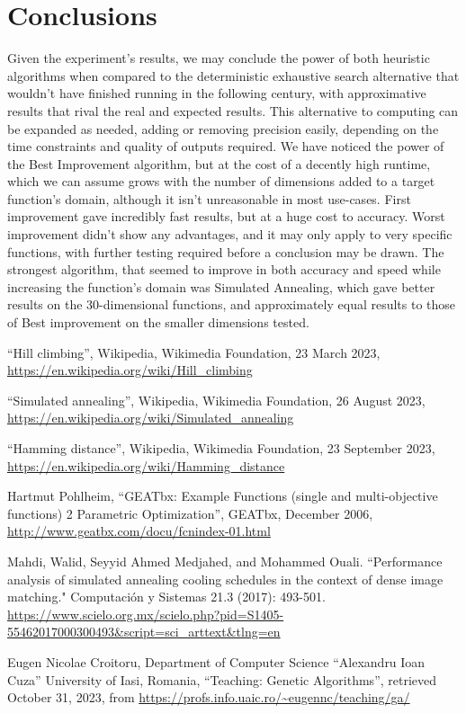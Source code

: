 \documentclass{article}
\begin{document}
\section{Conclusions}
Given the experiment's results, we may conclude the power of both heuristic algorithms when compared to the deterministic exhaustive search alternative that wouldn't have finished running in the following century, with approximative results that rival the real and expected results. This alternative to computing can be expanded as needed, adding or removing precision easily, depending on the time constraints and quality of outputs required. We have noticed the power of the Best Improvement algorithm, but at the cost of a decently high runtime, which we can assume grows with the number of dimensions added to a target function's domain, although it isn't unreasonable in most use-cases. First improvement gave incredibly fast results, but at a huge cost to accuracy. Worst improvement didn't show any advantages, and it may only apply to very specific functions, with further testing required before a conclusion may be drawn. The strongest algorithm, that seemed to improve in both accuracy and speed while increasing the function's domain was Simulated Annealing, which gave better results on the 30-dimensional functions, and approximately equal results to those of Best improvement on the smaller dimensions tested.

\begin{thebibliography}{9}

``Hill climbing'', Wikipedia, Wikimedia Foundation, 23 March 2023, \url{https://en.wikipedia.org/wiki/Hill\_climbing}

``Simulated annealing'', Wikipedia, Wikimedia Foundation, 26 August 2023, \url{https://en.wikipedia.org/wiki/Simulated\_annealing}

``Hamming distance'', Wikipedia, Wikimedia Foundation, 23 September 2023, \url{https://en.wikipedia.org/wiki/Hamming\_distance}

Hartmut Pohlheim, ``GEATbx: Example Functions (single and multi-objective functions) 2 Parametric Optimization'', GEATbx, December 2006, \url{http://www.geatbx.com/docu/fcnindex-01.html}

Mahdi, Walid, Seyyid Ahmed Medjahed, and Mohammed Ouali. ``Performance analysis of simulated annealing cooling schedules in the context of dense image matching." Computación y Sistemas 21.3 (2017): 493-501. \url{https://www.scielo.org.mx/scielo.php?pid=S1405-55462017000300493&script=sci_arttext&tlng=en}

Eugen Nicolae Croitoru, Department of Computer Science ``Alexandru Ioan Cuza'' University of Iasi, Romania, ``Teaching: Genetic Algorithms'', retrieved October 31, 2023, from \url{https://profs.info.uaic.ro/~eugennc/teaching/ga/}

\end{thebibliography}
\end{document}
